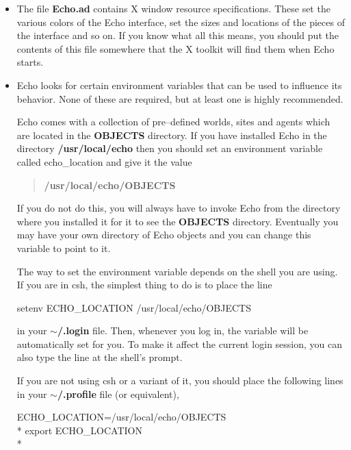 \begin{itemize}

\item
The file {\bf Echo.ad} contains X window  resource
 specifications.
These set the various colors of the Echo interface, set the sizes and
locations of the pieces of the interface and so on. If you know what
all this means, you should put the contents of this file somewhere
that the X toolkit will find them when Echo starts.

\item
Echo looks for certain environment variables  that can be used to influence its behavior. None of these
are required, but at least one is highly recommended.

Echo  comes with a collection of pre--defined
worlds, sites and agents which are located in the {\bf OBJECTS}
directory. If you have installed Echo in the directory {\bf
/usr/local/echo} then you should set an environment variable called
{\sc echo\_location} and give it the value

\begin{verse}
{\bf /usr/local/echo/OBJECTS}
\end{verse}

If you do not do this, you will always have to invoke Echo from the
directory where you installed it for it to see the {\bf OBJECTS}
directory. Eventually you may have your own directory of Echo objects
and you can change this variable to point to it.

The way to set the environment variable depends on the shell you are
using. If you are in csh, the simplest thing to do is to place the
line

\begin{shell}
setenv ECHO\_LOCATION /usr/local/echo/OBJECTS
\end{shell}

in your {\bf $\sim$/.login} file. Then, whenever you log in, the variable
will be automatically set for you. To make it affect the current login
session, you can also type the line at the shell's prompt.

If you are not using csh or a variant of it, you should place the
following lines in your {\bf $\sim$/.profile} file (or equivalent),

\begin{shell}
ECHO\_LOCATION=/usr/local/echo/OBJECTS \\*
export ECHO\_LOCATION \\*
\end{shell}


\end{itemize}
